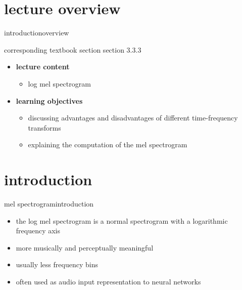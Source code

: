 


\subtitle{Module 3.3.3: Time-Frequency Representations~---~(Log) Mel-Spectrogram}


	

    \section[overview]{lecture overview}
        \begin{frame}{introduction}{overview}
            \begin{block}{corresponding textbook section}
                    section 3.3.3
            \end{block}

            \begin{itemize}
                \item   \textbf{lecture content}
                    \begin{itemize}
                        \item   log mel spectrogram
                    \end{itemize}
                \bigskip
                \item<2->   \textbf{learning objectives}
                    \begin{itemize}
                        \item   discussing advantages and disadvantages of different time-frequency transforms
                        \item   explaining the computation of the mel spectrogram
                    \end{itemize}
            \end{itemize}
        \end{frame}
        
    \section[intro]{introduction}
        \begin{frame}{mel spectrogram}{introduction}
            \begin{itemize}
                \item   the log mel spectrogram is a normal spectrogram with a logarithmic frequency axis
                \bigskip
                \item   more musically and perceptually meaningful
                \item   usually less frequency bins
                \item   often used as audio input representation to neural networks
            \end{itemize}
        \end{frame}
        
